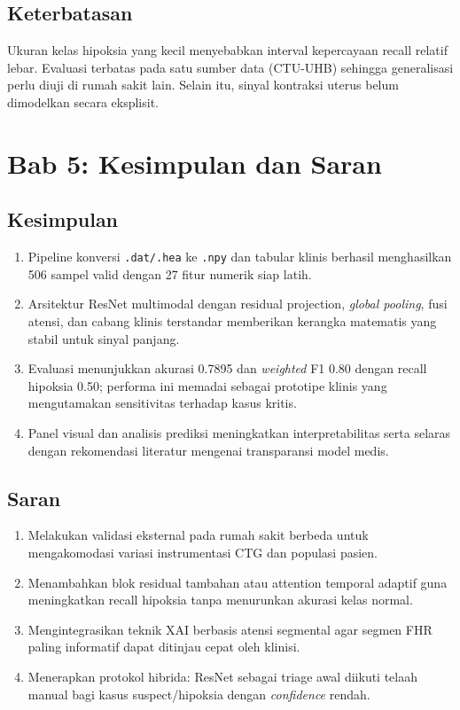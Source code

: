 \documentclass[12pt,a4paper]{article}
\begin{document}
\subsection{Keterbatasan}
Ukuran kelas hipoksia yang kecil menyebabkan interval kepercayaan recall relatif lebar. Evaluasi terbatas pada satu sumber data (CTU-UHB) sehingga generalisasi perlu diuji di rumah sakit lain. Selain itu, sinyal kontraksi uterus belum dimodelkan secara eksplisit.

\section{Bab 5: Kesimpulan dan Saran}
\subsection{Kesimpulan}
\begin{enumerate}[label=\arabic*)]
    \item Pipeline konversi \texttt{.dat/.hea} ke \texttt{.npy} dan tabular klinis berhasil menghasilkan 506 sampel valid dengan 27 fitur numerik siap latih.
    \item Arsitektur ResNet multimodal dengan residual projection, \textit{global pooling}, fusi atensi, dan cabang klinis terstandar memberikan kerangka matematis yang stabil untuk sinyal panjang.
    \item Evaluasi menunjukkan akurasi 0.7895 dan \textit{weighted} F1 0.80 dengan recall hipoksia 0.50; performa ini memadai sebagai prototipe klinis yang mengutamakan sensitivitas terhadap kasus kritis.
    \item Panel visual dan analisis prediksi meningkatkan interpretabilitas serta selaras dengan rekomendasi literatur mengenai transparansi model medis.
\end{enumerate}

\subsection{Saran}
\begin{enumerate}[label=\arabic*)]
    \item Melakukan validasi eksternal pada rumah sakit berbeda untuk mengakomodasi variasi instrumentasi CTG dan populasi pasien.
    \item Menambahkan blok residual tambahan atau attention temporal adaptif guna meningkatkan recall hipoksia tanpa menurunkan akurasi kelas normal.
    \item Mengintegrasikan teknik XAI berbasis atensi segmental agar segmen FHR paling informatif dapat ditinjau cepat oleh klinisi.
    \item Menerapkan protokol hibrida: ResNet sebagai triage awal diikuti telaah manual bagi kasus suspect/hipoksia dengan \textit{confidence} rendah.
\end{enumerate}
\end{document}
